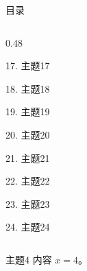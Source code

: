 \documentclass[aspectratio=169,10pt,fontset=fandol]{ctexbeamer}
\begin{document}
\begin{frame}[t,fragile]{目录}
\begin{columns}[T,onlytextwidth]
\begin{column}{0.48\textwidth}
{\color{gray!40}\small 17. 主题17\par}\vspace{0.22em}
{\color{gray!40}\small 18. 主题18\par}\vspace{0.22em}
{\color{gray!40}\small 19. 主题19\par}\vspace{0.22em}
{\color{gray!40}\small 20. 主题20\par}\vspace{0.22em}
{\color{gray!40}\small 21. 主题21\par}\vspace{0.22em}
{\color{gray!40}\small 22. 主题22\par}\vspace{0.22em}
{\color{gray!40}\small 23. 主题23\par}\vspace{0.22em}
{\color{gray!40}\small 24. 主题24\par}\vspace{0.22em}
\end{column}
\end{columns}
\end{frame}
\begin{frame}[t,fragile]{主题4}
\normalsize
{\normalsize
内容 $x=4$。
}
\end{frame}
\end{document}
